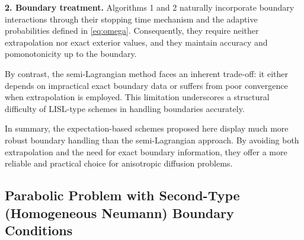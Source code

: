 \documentclass[11pt]{article}
\theoremstyle{mythm}
\theoremstyle{definition}
\begin{document}
	\textbf{2. Boundary treatment.}
	Algorithms 1 and 2 naturally incorporate boundary interactions through their stopping time mechanism and the adaptive probabilities defined in \eqref{eq:omega}. Consequently, they require neither extrapolation nor exact exterior values, and they maintain  accuracy and pomonotonicity  up to the boundary.
	
	By contrast, the semi-Lagrangian method faces an inherent trade-off: it either depends on impractical exact boundary data or suffers from poor convergence when extrapolation is employed. This limitation underscores a structural difficulty of LISL-type schemes in handling boundaries accurately.
	\medskip
	
	In summary, the expectation-based schemes proposed here display much more robust boundary handling than the semi-Lagrangian approach. By avoiding both extrapolation and the need for exact boundary information, they offer a more reliable and practical choice for anisotropic diffusion problems.
	
	
	
	
	
	\subsection{Parabolic Problem with Second-Type (Homogeneous Neumann) Boundary Conditions}
	\label{subsec:numerics-reflective}
	
\end{document}
